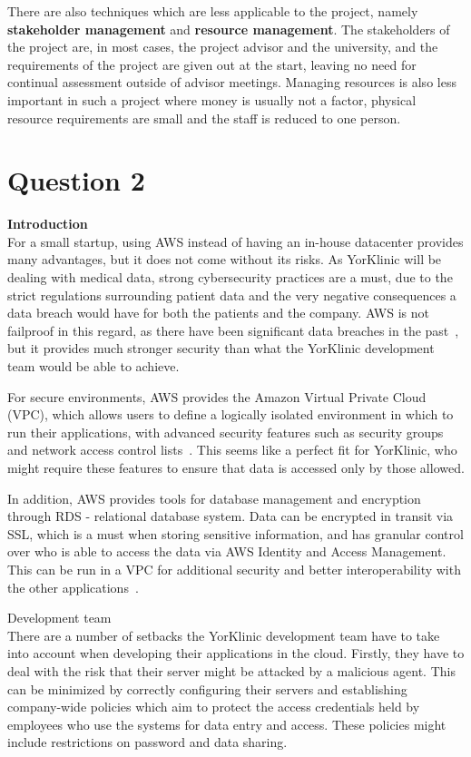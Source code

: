 \documentclass[12pt]{report}
\begin{document}
There are also techniques which are less applicable to the project, namely \textbf{stakeholder management} and \textbf{resource management}. The stakeholders of the project are, in most cases, the project advisor and the university, and the requirements of the project are given out at the start, leaving no need for continual assessment outside of advisor meetings. Managing resources is also less important in such a project where money is usually not a factor, physical resource requirements are small and the staff is reduced to one person.

\newpage
\section*{Question 2}
\textbf{Introduction}\\
For a small startup, using AWS instead of having an in-house datacenter provides many advantages, but it does not come without its risks. As YorKlinic will be dealing with medical data, strong cybersecurity practices are a must, due to the strict regulations surrounding patient data and the very negative consequences a data breach would have for both the patients and the company. AWS is not failproof in this regard, as there have been significant data breaches in the past~\cite{breach}, but it provides much stronger security than what the YorKlinic development team would be able to achieve.

For secure environments, AWS provides the Amazon Virtual Private Cloud (VPC), which allows users to define a logically isolated environment in which to run their applications, with advanced security features such as security groups and network access control lists~\cite{vpc}. This seems like a perfect fit for YorKlinic, who might require these features to ensure that data is accessed only by those allowed.
    
In addition, AWS provides tools for database management and encryption through RDS \-- relational database system. Data can be encrypted in transit via SSL, which is a must when storing sensitive information, and has granular control over who is able to access the data via AWS Identity and Access Management. This can be run in a VPC for additional security and better interoperability with the other applications~\cite{rds}.

Development team \\
There are a number of setbacks the YorKlinic development team have to take into account when developing their applications in the cloud. Firstly, they have to deal with the risk that their server might be attacked by a malicious agent. This can be minimized by correctly configuring their servers and establishing company-wide policies which aim to protect the access credentials held by employees who use the systems for data entry and access. These policies might include restrictions on password and data sharing.
\end{document}
